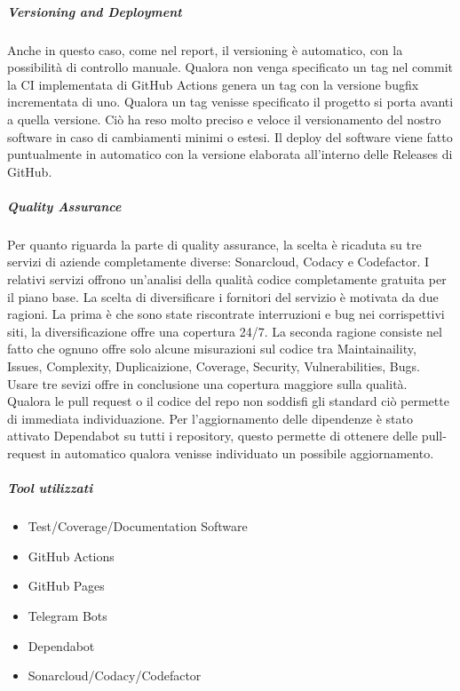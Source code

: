         \subparagraph{Versioning and Deployment} Anche in questo caso, come nel report, il versioning è automatico, con la possibilità di controllo manuale. Qualora non venga specificato un tag nel commit la CI implementata di GitHub Actions genera un tag con la versione bugfix incrementata di uno. Qualora un tag venisse specificato il progetto si porta avanti a quella versione. Ciò ha reso molto preciso e veloce il versionamento del nostro software in caso di cambiamenti minimi o estesi.
        Il deploy del software viene fatto puntualmente in automatico con la versione elaborata all'interno delle Releases di GitHub.
        
        \subparagraph{Quality Assurance}
        Per quanto riguarda la parte di quality assurance, la scelta è ricaduta su tre servizi di aziende completamente diverse: Sonarcloud, Codacy e Codefactor. I relativi servizi offrono un'analisi della qualità codice completamente gratuita per il piano base. La scelta di diversificare i fornitori del servizio è motivata da due ragioni. La prima è che sono state riscontrate interruzioni e bug nei corrispettivi siti, la diversificazione offre una copertura 24/7. La seconda ragione consiste nel fatto che ognuno offre solo alcune misurazioni sul codice tra Maintainaility, Issues, Complexity, Duplicaizione, Coverage, Security, Vulnerabilities, Bugs. Usare tre sevizi offre in conclusione una copertura maggiore sulla qualità. Qualora le pull request o il codice del repo non soddisfi gli standard ciò permette di immediata individuazione. 
        Per l'aggiornamento delle dipendenze è stato attivato Dependabot su tutti i repository, questo permette di ottenere delle pull-request in automatico qualora venisse individuato un possibile aggiornamento.
        
        \subparagraph{Tool utilizzati}
        \begin{itemize}
            \item Test/Coverage/Documentation Software
            \item GitHub Actions
            \item GitHub Pages
            \item Telegram Bots
            \item Dependabot
            \item Sonarcloud/Codacy/Codefactor
        \end{itemize}








